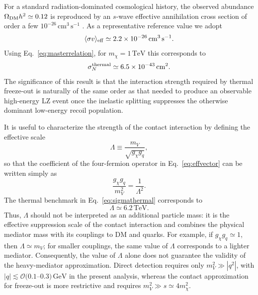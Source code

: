 \documentclass[aps,prd,reprint,superscriptaddress,nofootinbib,longbibliography,floatfix]{revtex4-2}
\newcommand{\GeV}{\mathrm{GeV}}
\newcommand{\TeV}{\mathrm{TeV}}
\begin{document}
For a standard radiation-dominated cosmological history, the observed abundance $\Omega_{\rm DM}h^2\simeq0.12$ \cite{Planck2018} is reproduced by an $s$-wave effective annihilation cross section of order a few $10^{-26}\,\mathrm{cm^3\,s^{-1}}$ \cite{Bringmann2012Thermal}. As a representative reference value we adopt
\begin{equation}
\langle\sigma v\rangle_{\rm eff}\simeq2.2\times10^{-26}\,\mathrm{cm^3\,s^{-1}}.
\end{equation}
Using Eq.~\eqref{eq:masterrelation}, for $m_\chi=1\,\TeV$ this corresponds to
\begin{equation}
\sigma_N^{\rm thermal}\simeq6.5\times10^{-43}\,\mathrm{cm^2}.
\label{eq:sigmathermal}
\end{equation}
The significance of this result is that the interaction strength required by thermal freeze-out is naturally of the same order as that needed to produce an observable high-energy LZ event once the inelastic splitting suppresses the otherwise dominant low-energy recoil population.

It is useful to characterize the strength of the contact interaction by defining the effective scale
\begin{equation}
\Lambda\equiv\frac{m_V}{\sqrt{g_\chi g_q}},
\label{eq:Lambda}
\end{equation}
so that the coefficient of the four-fermion operator in Eq.~\eqref{eq:effvector} can be written simply as
\begin{equation}
\frac{g_\chi g_q}{m_V^2}=\frac{1}{\Lambda^2}.
\end{equation}
The thermal benchmark in Eq.~\eqref{eq:sigmathermal} corresponds to
\begin{equation}
\Lambda\simeq6.2\,\TeV.
\end{equation}
Thus, $\Lambda$ should not be interpreted as an additional particle mass: it is the effective suppression scale of the contact interaction and combines the physical mediator mass with its couplings to DM and quarks. For example, if $g_\chi g_q\simeq1$, then $\Lambda\simeq m_V$; for smaller couplings, the same value of $\Lambda$ corresponds to a lighter mediator. Consequently, the value of $\Lambda$ alone does not guarantee the validity of the heavy-mediator approximation. Direct detection requires only $m_V^2\gg |q^2|$, with $|q|\lesssim\mathcal{O}(0.1$--$0.3)\,\GeV$ in the present analysis, whereas the contact approximation for freeze-out is more restrictive and requires $m_V^2\gg s\simeq4m_\chi^2$.
\end{document}
